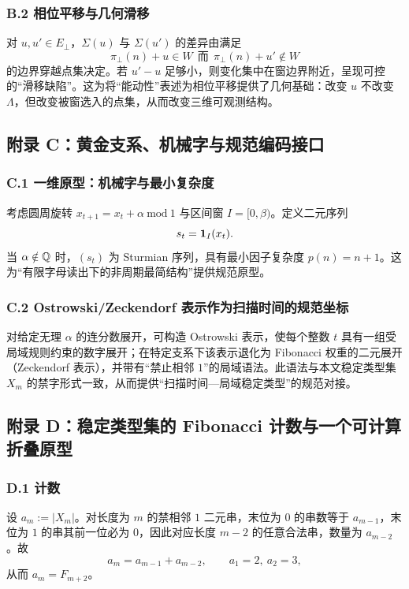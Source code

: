 \subsubsection{B.2 相位平移与几何滑移}

对 $u,u'\in E_{\perp}$，$\Sigma(u)$ 与 $\Sigma(u')$ 的差异由满足
\[
\pi_{\perp}(n)+u\in W\ \ \text{而}\ \ \pi_{\perp}(n)+u'\notin W
\]
的边界穿越点集决定。若 $u'-u$ 足够小，则变化集中在窗边界附近，呈现可控的“滑移缺陷”。这为将“能动性”表述为相位平移提供了几何基础：改变 $u$ 不改变 $\Lambda$，但改变被窗选入的点集，从而改变三维可观测结构。

\subsection{附录 C：黄金支系、机械字与规范编码接口}

\subsubsection{C.1 一维原型：机械字与最小复杂度}

考虑圆周旋转 $x_{t+1}=x_t+\alpha\ \mathrm{mod}\ 1$ 与区间窗 $I=[0,\beta)$。定义二元序列
\[
s_t=\mathbf{1}_I(x_t).
\]
当 $\alpha\notin\mathbb{Q}$ 时，$(s_t)$ 为 Sturmian 序列，具有最小因子复杂度 $p(n)=n+1$。这为“有限字母读出下的非周期最简结构”提供规范原型。

\subsubsection{C.2 Ostrowski/Zeckendorf 表示作为扫描时间的规范坐标}

对给定无理 $\alpha$ 的连分数展开，可构造 Ostrowski 表示，使每个整数 $t$ 具有一组受局域规则约束的数字展开；在特定支系下该表示退化为 Fibonacci 权重的二元展开（Zeckendorf 表示），并带有“禁止相邻 $1$”的局域语法。此语法与本文稳定类型集 $X_m$ 的禁字形式一致，从而提供“扫描时间—局域稳定类型”的规范对接。

\subsection{附录 D：稳定类型集的 Fibonacci 计数与一个可计算折叠原型}

\subsubsection{D.1 计数}

设 $a_m:=|X_m|$。对长度为 $m$ 的禁相邻 $1$ 二元串，末位为 $0$ 的串数等于 $a_{m-1}$，末位为 $1$ 的串其前一位必为 $0$，因此对应长度 $m-2$ 的任意合法串，数量为 $a_{m-2}$。故
\[
a_m=a_{m-1}+a_{m-2},\qquad a_1=2,\ a_2=3,
\]
从而 $a_m=F_{m+2}$。

